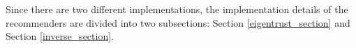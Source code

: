 	Since there are two different implementations, the implementation details of the recommenders are divided into two subsections: Section \ref{eigentrust_section} and Section \ref{inverse_section}.